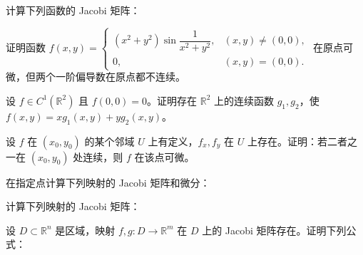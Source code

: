 \newpage
\noindent\begin{minipage}{\textwidth}
计算下列函数的 Jacobi 矩阵：
\end{minipage}\par\vfill
\noindent\begin{minipage}{\textwidth}
证明函数 $f(x,y)=\begin{cases}(x^2+y^2)\sin\dfrac1{x^2+y^2},&(x,y)\ne(0,0),\\0,&(x,y)=(0,0).\end{cases}$ 在原点可微，但两个一阶偏导数在原点都不连续。
\end{minipage}\par\vfill
\noindent\begin{minipage}{\textwidth}
设 $f\in C^1(\mathbb R^2)$ 且 $f(0,0)=0$。证明存在 $\mathbb R^2$ 上的连续函数 $g_1,g_2$，使 $f(x,y)=xg_1(x,y)+yg_2(x,y)$。
\end{minipage}\par\vfill
\newpage
\noindent\begin{minipage}{\textwidth}
设 $f$ 在 $(x_0,y_0)$ 的某个邻域 $U$ 上有定义，$f_x,f_y$ 在 $U$ 上存在。证明：若二者之一在 $(x_0,y_0)$ 处连续，则 $f$ 在该点可微。
\end{minipage}\par\vfill
\noindent\begin{minipage}{\textwidth}
在指定点计算下列映射的 Jacobi 矩阵和微分：
\end{minipage}\par\vfill
\noindent\begin{minipage}{\textwidth}
计算下列映射的 Jacobi 矩阵：
\end{minipage}\par\vfill
\newpage
\noindent\begin{minipage}{\textwidth}
设 $D\subset\mathbb R^n$ 是区域，映射 $f,g:D\to\mathbb R^m$ 在 $D$ 上的 Jacobi 矩阵存在。证明下列公式：
\end{minipage}\par\vfill
